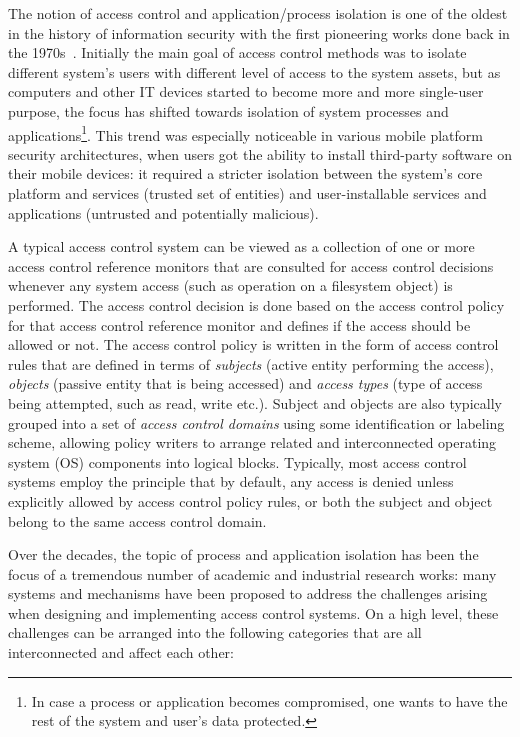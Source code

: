 
The notion of access control and application/process isolation is one of the oldest in the history of information security with the first pioneering works done back in the 1970s~\cite{saltzer75, Denning76}. Initially the main goal of access control methods was to isolate different system's users with different level of access to the system assets, but as computers and other IT devices started to become more and more single-user purpose, the focus has shifted towards isolation of system processes and applications\footnote{In case a process or application becomes compromised, one wants to have the rest of the system and user's data protected.}.
 This trend was especially noticeable in various mobile platform security architectures, when users got the ability to install third-party software on their mobile devices: it required a stricter isolation between the system's core platform and services (trusted set of entities) and user-installable services and applications (untrusted and potentially malicious).

A typical access control system can be viewed as a collection of one or more access control reference monitors that are consulted for access control decisions whenever any system access (such as operation on a filesystem object) is performed. The access control decision is done based on the access control policy for that access control reference monitor and defines if the access should be allowed or not. The access control policy is written in the form of access control rules that are defined in terms of \textit{subjects} (active entity performing the access), \textit{objects} (passive entity that is being accessed) and \textit{access types} (type of access being attempted, such as read, write etc.). Subject and objects are also typically grouped into a set of \textit{access control domains} using some identification or labeling scheme, allowing policy writers to arrange related and interconnected operating system (OS) components into logical blocks. Typically, most access control systems employ the principle that by default, any access is denied unless explicitly allowed by access control policy rules, or both the subject and object belong to the same access control domain.
 
Over the decades, the topic of process and application isolation has been the focus of a tremendous number of academic and industrial research works: many systems and mechanisms have been proposed to address the challenges arising when designing and implementing access control systems. On a high level, these challenges can be arranged into the following categories that are all interconnected and affect each other: 

